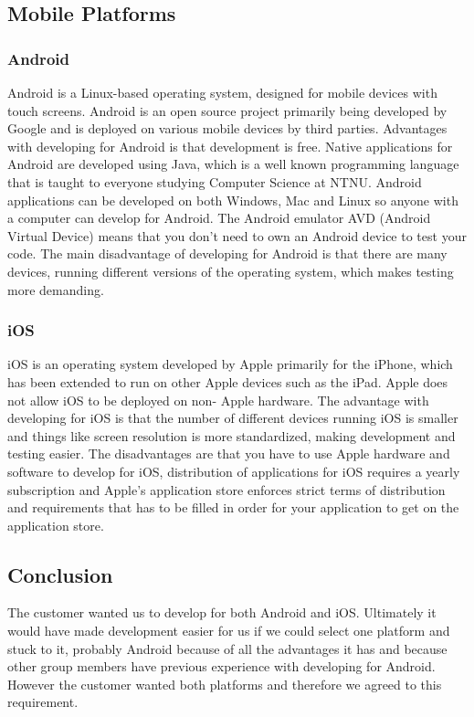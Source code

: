 \subsection{Mobile Platforms}

\subsubsection*{Android}

    Android is a Linux-based operating system, designed for mobile devices with touch screens.
    Android is an open source project primarily being developed by Google and is deployed on various
    mobile devices by third parties.\cite{android} Advantages with developing for Android is that
    development is free. Native applications for Android are developed using Java, which is a well
    known programming language that is taught to everyone studying Computer Science at NTNU. Android
    applications can be developed on both Windows, Mac and Linux so anyone with a computer can
    develop for Android. The Android emulator AVD (Android Virtual Device) means that you don't need
    to own an Android device to test your code. The main disadvantage of developing for Android is
    that there are many devices, running different versions of the operating system, which makes
    testing more demanding.

\subsubsection*{iOS}

    iOS is an operating system developed by Apple primarily for the iPhone, which has been extended
    to run on other Apple devices such as the iPad. Apple does not allow iOS to be deployed on non-
    Apple hardware.\cite{ios} The advantage with developing for iOS is that the number of different
    devices running iOS is smaller and things like screen resolution is more standardized, making
    development and testing easier. The disadvantages are that you have to use Apple hardware and
    software to develop for iOS, distribution of applications for iOS requires a yearly
    subscription\cite{iosCost} and Apple's application store enforces strict terms of distribution
    and requirements that has to be filled in order for your application to get on the application
    store.

\subsection{Conclusion}

    The customer wanted us to develop for both Android and iOS.
    Ultimately it would have made development easier for us if we could select one platform and
    stuck to it, probably Android because of all the advantages it has and because other group
    members have previous experience with developing for Android. However the customer wanted both
    platforms and therefore we agreed to this requirement.
